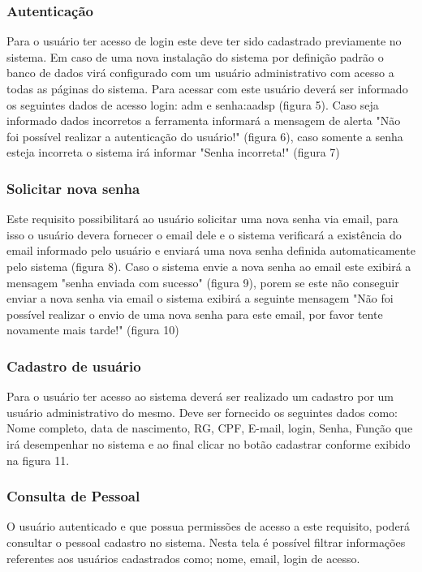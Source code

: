 \documentclass{acm_proc_article-sp}
\begin{document}
\subsubsection{Autenticação}
Para o usuário ter acesso de login este deve ter sido cadastrado previamente no sistema. Em caso de uma nova instalação do sistema por definição padrão o banco de dados virá configurado com um usuário administrativo com  acesso a todas as páginas do sistema. Para acessar com este usuário deverá ser informado os seguintes dados de acesso login: adm e senha:aadsp (figura 5). Caso seja informado dados incorretos a ferramenta informará a mensagem de alerta "Não foi possível realizar a autenticação do usuário!" (figura 6), caso somente a senha esteja incorreta o sistema irá informar "Senha incorreta!" (figura 7)

\subsubsection{Solicitar nova senha}
Este requisito possibilitará ao usuário solicitar uma nova senha via email, para isso o usuário devera fornecer o email dele e o sistema verificará a existência do email informado pelo usuário e enviará uma nova senha definida automaticamente pelo sistema (figura 8). Caso o sistema envie a nova senha ao email este exibirá a mensagem "senha enviada com sucesso" (figura 9), porem se este não conseguir enviar a nova senha via email o sistema exibirá a seguinte mensagem "Não foi possível realizar o envio de uma nova senha para este email, por favor tente novamente mais tarde!" (figura 10)

\subsubsection{Cadastro de usuário}
Para o usuário ter acesso ao sistema deverá ser realizado um cadastro por um usuário administrativo do mesmo. Deve ser fornecido os seguintes dados como: Nome completo, data de nascimento, RG, CPF, E-mail, login, Senha, Função que irá desempenhar no sistema e ao final clicar no botão cadastrar conforme exibido na figura 11.

\subsubsection{Consulta de Pessoal}
O usuário autenticado e que possua permissões de acesso a este requisito, poderá consultar o pessoal cadastro no sistema. Nesta tela é possível filtrar informações referentes aos usuários cadastrados como; nome, email, login de acesso.   
\end{document}
